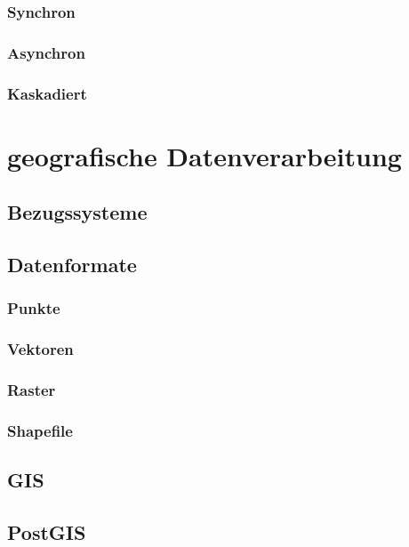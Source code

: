 \subsubsection{Synchron}

\subsubsection{Asynchron}

\subsubsection{Kaskadiert}

\newpage

\section{geografische Datenverarbeitung}

\subsection{Bezugssysteme}

\subsection{Datenformate}

\subsubsection{Punkte}

\subsubsection{Vektoren}

\subsubsection{Raster}

\subsubsection{Shapefile}

\subsection{GIS}

\subsection{PostGIS}

